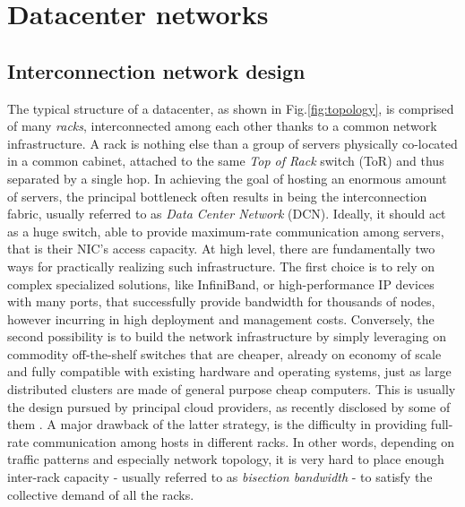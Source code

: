 \chapter{Datacenter networks}
\label{ch1}
\section{Interconnection network design}
\label{sec:topology}
The typical structure of a datacenter, as shown in Fig.\ref{fig:topology},  
is comprised of many \textit{racks}, interconnected among each other thanks to a common network infrastructure. A rack is nothing else than a group of servers physically co-located in a common cabinet, attached to the same \textit{Top of Rack} switch (ToR) and thus  separated by a single hop. In achieving the goal of hosting an enormous amount of servers, the principal bottleneck often results in being the interconnection fabric, usually referred to as \textit{Data Center Network} (DCN). Ideally, it should act as a huge switch, able to provide maximum-rate communication among servers, that is their NIC's access capacity.  At high level, there are fundamentally two ways for practically realizing such infrastructure. The first choice is to rely on complex specialized solutions, like InfiniBand, or high-performance IP devices with many ports, that successfully provide bandwidth for thousands of nodes, however incurring in high deployment and management costs. Conversely, the second possibility is to build the network infrastructure by simply leveraging on commodity off-the-shelf switches that are cheaper, already on economy of scale and fully compatible with existing hardware and operating systems, just as large distributed clusters are made of general purpose cheap computers. This is usually the design pursued by principal cloud providers, as recently disclosed by some of them \cite{jupiter, facebook_dcn}. A major drawback of the latter strategy, is the difficulty in providing full-rate communication among hosts in different racks. In other words, depending on traffic patterns and especially network topology, it is very hard to place enough inter-rack capacity - usually referred to as \textit{bisection bandwidth} - to satisfy the collective demand of all the racks. 
